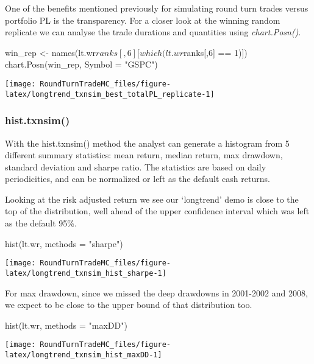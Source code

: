 One of the benefits mentioned previously for simulating round turn
trades versus portfolio PL is the transparency. For a closer look at the
winning random replicate we can analyse the trade durations and
quantities using \emph{chart.Posn()}.

\begin{Schunk}
\begin{Sinput}
win_rep <- names(lt.wr$ranks[,6][which(lt.wr$ranks[,6] == 1)])
chart.Posn(win_rep, Symbol = "GSPC")
\end{Sinput}


\begin{center}\texttt{[image: RoundTurnTradeMC\_files/figure-latex/longtrend\_txnsim\_best\_totalPL\_replicate-1]} \end{center}

\end{Schunk}

\hypertarget{hist.txnsim}{%
\subsubsection{hist.txnsim()}\label{hist.txnsim}}

With the hist.txnsim() method the analyst can generate a histogram from
5 different summary statistics: mean return, median return, max
drawdown, standard deviation and sharpe ratio. The statistics are based
on daily periodicities, and can be normalized or left as the default
cash returns.

Looking at the risk adjusted return we see our `longtrend' demo is close
to the top of the distribution, well ahead of the upper confidence
interval which was left as the default 95\%.

\begin{Schunk}
\begin{Sinput}
hist(lt.wr, methods = "sharpe")
\end{Sinput}


\begin{center}\texttt{[image: RoundTurnTradeMC\_files/figure-latex/longtrend\_txnsim\_hist\_sharpe-1]} \end{center}

\end{Schunk}

For max drawdown, since we missed the deep drawdowns in 2001-2002 and
2008, we expect to be close to the upper bound of that distribution too.

\begin{Schunk}
\begin{Sinput}
hist(lt.wr, methods = "maxDD")
\end{Sinput}


\begin{center}\texttt{[image: RoundTurnTradeMC\_files/figure-latex/longtrend\_txnsim\_hist\_maxDD-1]} \end{center}

\end{Schunk}

